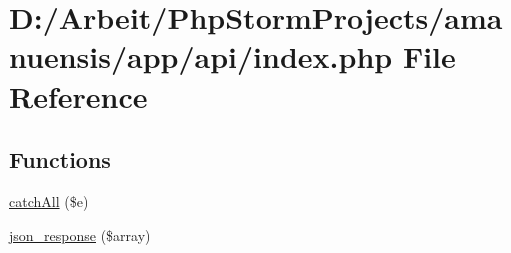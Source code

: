 \hypertarget{index_8php}{}\section{D\+:/\+Arbeit/\+Php\+Storm\+Projects/amanuensis/app/api/index.php File Reference}
\label{index_8php}
\subsection*{Functions}
\begin{DoxyCompactItemize}
\item 
\hyperlink{index_8php_a2a4d0fc0c8817862d5c0c4769c909fa3}{catch\+All} (\$e)
\item 
\hyperlink{index_8php_a289e5852ae9a348e1a0ef87aa3ce1c8c}{json\+\_\+response} (\$array)
\end{DoxyCompactItemize}
